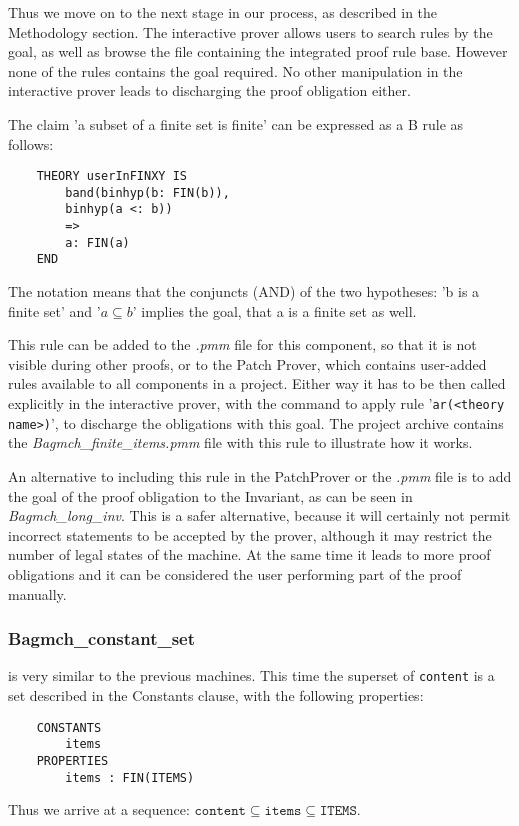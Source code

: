 \documentclass[11pt,journal]{IEEEtran}
\begin{document}
	Thus we move on to the next stage in our process, as described in the Methodology section. The interactive prover allows users to search rules by the goal, as well as browse the file containing the integrated proof rule base. However none of the rules contains the goal required. No other manipulation in the interactive prover leads to discharging the proof obligation either.
	
	The claim 'a subset of a finite set is finite' can be expressed as a B rule as follows:
		
	\begin{lstlisting}
	THEORY userInFINXY IS
		band(binhyp(b: FIN(b)), 
		binhyp(a <: b))
		=>
		a: FIN(a)
	END
	\end{lstlisting}
	
	The notation means that the conjuncts (AND) of the two hypotheses: 'b is a finite set' and '$a \subseteq b$' implies the goal, that a is a finite set as well.
	
	This rule can be added to the \emph{.pmm} file for this component, so that it is not visible during other proofs, or to the Patch Prover, which contains user-added rules available to all components in a project. Either way it has to be then called explicitly in the interactive prover, with the command to apply rule '\texttt{ar(<theory name>)}', to discharge the obligations with this goal. The project archive contains the \emph{Bagmch\_finite\_items.pmm} file with this rule to illustrate how it works. 
	
	An alternative to including this rule in the PatchProver or the \emph{.pmm} file is to add the goal of the proof obligation to the Invariant, as can be seen in \emph{Bagmch\_long\_inv}. This is a safer alternative, because it will certainly not permit incorrect statements to be accepted by the prover, although it may restrict the number of legal states of the machine. At the same time it leads to more proof obligations and it can be considered the user performing part of the proof manually.
	
	\subsubsection{Bagmch\_constant\_set} is very similar to the previous machines. This time the superset of \texttt{content} is a set described in the Constants clause, with the following properties:
	
	\begin{lstlisting}
	CONSTANTS
		items
	PROPERTIES
		items : FIN(ITEMS)
	\end{lstlisting}
	Thus we arrive at a sequence: $\texttt{content} \subseteq \texttt{items} \subseteq \texttt{ITEMS}$.
	
\end{document}
